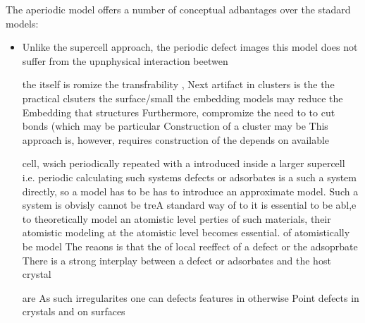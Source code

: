 \documentclass[a4paper,11pt,headings=normal]{scrartcl}
\begin{document}
The aperiodic model offers a number of conceptual adbantages over the stadard models:
\begin{itemize}
  \item Unlike the supercell approach, the periodic defect images this model does not suffer from the upnphysical interaction beetwen 



the itself is romize the transfrability ,  Next artifact in clusters is the the practical clsuters the surface/small  the embedding models may reduce the  Embedding that   structures Furthermore, compromize the   need to to cut bonds (which may be particular Construction of a cluster may be This approach is, however, requires construction of the depends on available 

cell, wsich periodically repeated with a introduced inside a larger supercell  i.e. periodic    calculating such systems  defects or adsorbates is a  such a system directly, so a model has to be  has to introduce an approximate model.  Such a system is obvisly cannot be treA standard way of   to it is essential to be abl,e to theoretically model an atomistic level perties of such materials, their atomistic modeling at the atomistic level becomes essential. of  atomistically be model      The reaons is that the  of      local reeffect of a defect or the adsoprbate  There is a strong interplay between a defect or adsorbates and the host crystal 



are   As such irregularites one can defects      features in otherwise Point defects in crystals and on surfaces  



\end{itemize}
\end{document}
